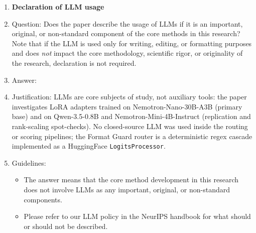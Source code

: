 \begin{enumerate}
\item {\bf Declaration of LLM usage}
    \item[] Question: Does the paper describe the usage of LLMs if it is an important, original, or non-standard component of the core methods in this research? Note that if the LLM is used only for writing, editing, or formatting purposes and does \emph{not} impact the core methodology, scientific rigor, or originality of the research, declaration is not required.
    \item[] Answer: \answerYes{}
    \item[] Justification: LLMs are core subjects of study, not auxiliary tools: the paper investigates LoRA adapters trained on Nemotron-Nano-30B-A3B (primary base) and on Qwen-3.5-0.8B and Nemotron-Mini-4B-Instruct (replication and rank-scaling spot-checks). No closed-source LLM was used inside the routing or scoring pipelines; the Format Guard router is a deterministic regex cascade implemented as a HuggingFace \texttt{LogitsProcessor}.
    \item[] Guidelines:
    \begin{itemize}
        \item The answer \answerNA{} means that the core method development in this research does not involve LLMs as any important, original, or non-standard components.
        \item Please refer to our LLM policy in the NeurIPS handbook for what should or should not be described.
    \end{itemize}

\end{enumerate}